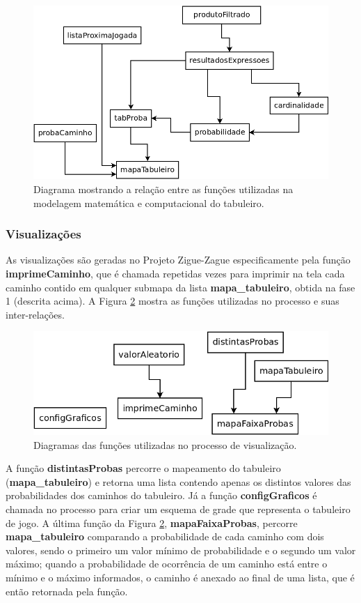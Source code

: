 \documentclass[12pt]{article}
\begin{document}
\begin{figure}[ht!]
	\centering
	\includegraphics[width=0.9\linewidth]{img/funcoes_auxiliares_mapaTabuleiro.png}
	\caption{Diagrama mostrando a relação entre as funções utilizadas na modelagem matemática e computacional do tabuleiro.}
	\label{funcoes_auxiliares_mapaTabuleiro}
\end{figure}

\subsubsection{Visualizações}
\label{visualizacoes}

As visualizações são geradas no Projeto Zigue-Zague especificamente pela função \textbf{imprimeCaminho}, que é chamada repetidas vezes para imprimir na tela cada caminho contido em qualquer submapa da lista \textbf{mapa\_tabuleiro}, obtida na fase 1 (descrita acima). A Figura \ref{funcoes_auxiliares_visualizacao} mostra as funções utilizadas no processo e suas inter-relações. 

\begin{figure}[ht!]
	\centering
	\includegraphics[width=0.8\linewidth]{img/funcoes_auxiliares_visualizacao.png}
	\caption{Diagramas das funções utilizadas no processo de visualização.}
	\label{funcoes_auxiliares_visualizacao}
\end{figure}

A função \textbf{distintasProbas} percorre o mapeamento do tabuleiro (\textbf{mapa\_tabuleiro}) e retorna uma lista contendo apenas os distintos valores das probabilidades dos caminhos do tabuleiro. Já a função \textbf{configGraficos} é chamada no processo para criar um esquema de grade que representa o tabuleiro de jogo. A última função da Figura \ref{funcoes_auxiliares_visualizacao}, \textbf{mapaFaixaProbas}, percorre \textbf{mapa\_tabuleiro} comparando a probabilidade de cada caminho com dois valores, sendo o primeiro um valor mínimo de probabilidade e o segundo um valor máximo; quando a probabilidade de ocorrência de um caminho está entre o mínimo e o máximo informados, o caminho é anexado ao final de uma lista, que é então retornada pela função.
\end{document}
